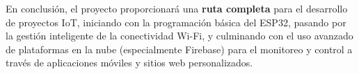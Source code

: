 \documentclass{article}
\begin{document}
En conclusión, el proyecto proporcionará una \textbf{ruta completa} para 
el desarrollo de proyectos IoT, iniciando con la programación 
básica del ESP32, pasando por la gestión inteligente de la conectividad 
Wi-Fi, y culminando con el uso avanzado de plataformas en la nube 
(especialmente Firebase) para el monitoreo y control a través de 
aplicaciones móviles y sitios web personalizados.
\end{document}
